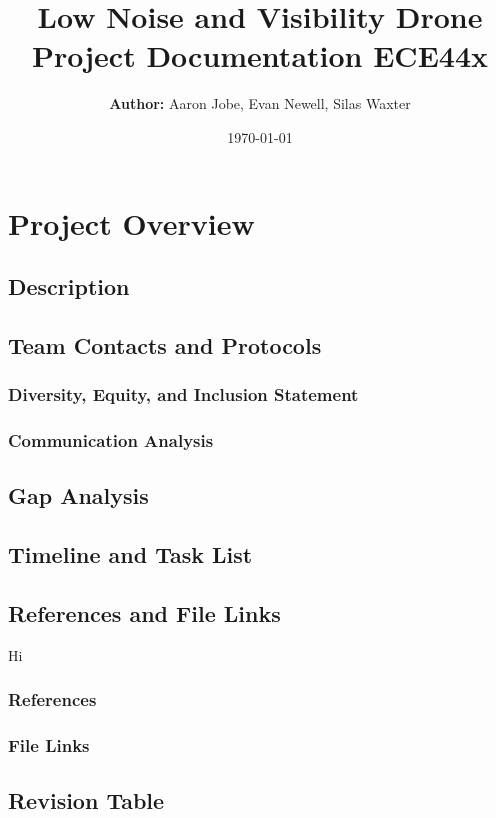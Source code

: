 \documentclass{article}
\title{
    \vspace{4cm}
    Low Noise and Visibility Drone \\
    \large Project Documentation ECE44x
}
\author{
    \textbf{Author:}
    Aaron Jobe, Evan Newell, Silas Waxter
}
\date{
    \vspace{8cm}
    \today
}
\begin{document}
\maketitle 
\newpage
\tableofcontents
\newpage

\section{Project Overview}

\subsection{Description}

\subsection{Team Contacts and Protocols}

\subsubsection{Diversity, Equity, and Inclusion Statement}

\subsubsection{Communication Analysis}

\subsection{Gap Analysis}

\subsection{Timeline and Task List}

\subsection{References and File Links}
Hi \cite{SweepingVoltage}
\subsubsection{References}


\subsubsection{File Links}

\subsection{Revision Table}
\end{document}
